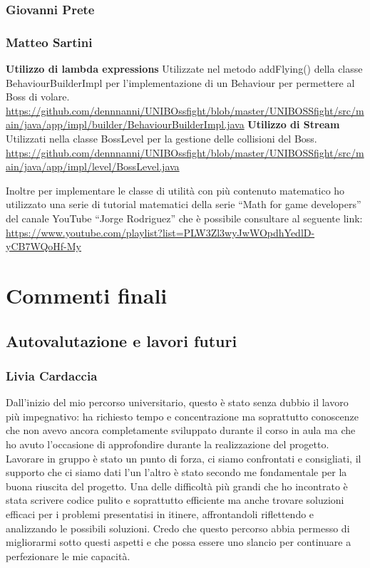 \documentclass[a4paper,12pt]{report}
\begin{document}
\subsection{Giovanni Prete}
\subsection{Matteo Sartini}
\textbf{Utilizzo di lambda expressions}
\newline
Utilizzate nel metodo addFlying() della classe BehaviourBuilderImpl per l'implementazione di un Behaviour per permettere al Boss di volare.
\url{https://github.com/dennnanni/UNIBOssfight/blob/master/UNIBOSSfight/src/main/java/app/impl/builder/BehaviourBuilderImpl.java}
\textbf{Utilizzo di Stream}
\newline
Utilizzati nella classe BossLevel per la gestione delle collisioni del Boss.
\url{https://github.com/dennnanni/UNIBOssfight/blob/master/UNIBOSSfight/src/main/java/app/impl/level/BossLevel.java}

Inoltre per implementare le classe di utilità con più contenuto matematico ho utilizzato una serie di tutorial matematici della serie “Math for game developers” del canale YouTube “Jorge Rodriguez” che è possibile consultare al seguente link:
\url{https://www.youtube.com/playlist?list=PLW3Zl3wyJwWOpdhYedlD-yCB7WQoHf-My}
\large
\chapter{Commenti finali}
\section{Autovalutazione e lavori futuri}
\subsection{Livia Cardaccia}
Dall'inizio del mio percorso universitario, questo è stato senza dubbio il lavoro più impegnativo: ha richiesto tempo e concentrazione ma soprattutto conoscenze che non avevo ancora completamente sviluppato durante il corso in aula ma che ho avuto l'occasione di approfondire durante la realizzazione del progetto. Lavorare in gruppo è stato un punto di forza, ci siamo confrontati e consigliati, il supporto che ci siamo dati l'un l'altro è stato secondo me fondamentale per la buona riuscita del progetto. Una delle difficoltà più grandi che ho incontrato è stata scrivere codice pulito e soprattutto efficiente ma anche trovare soluzioni efficaci per i problemi presentatisi in itinere, affrontandoli riflettendo e analizzando le possibili soluzioni. Credo che questo percorso abbia permesso di migliorarmi sotto questi aspetti e che possa essere uno slancio per continuare a perfezionare le mie capacità.
\end{document}
